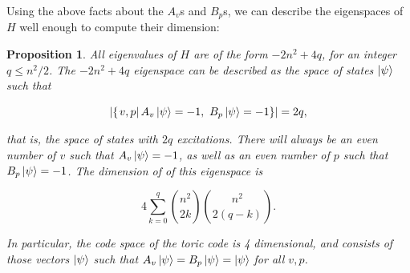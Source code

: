 \documentclass{article}
\newtheorem{proposition}{Proposition}[section]
\theoremstyle{definition}
\numberwithin{figure}{section}
\begin{document}
Using the above facts about the $A_v$s and $B_p$s, we can describe the eigenspaces of $H$ well enough to compute their dimension:

\begin{proposition}\label{eigenspaces} All eigenvalues of $H$ are of the form $-2n^2+4q$, for an integer $q\leq n^2/2$. The $-2n^2+4q$ eigenspace can be described as the space of states $\left|\psi\right>$ such that

$$\left|\left\{\left. v,p\right| A_v\left|\psi\right> =-1,\,\, B_p\left|\psi\right>=-1\right\}\right|=2q,$$

that is, the space of states with $2q$ excitations. There will always be an even number of $v$ such that $A_v\left|\psi\right> =-1$, as well as an even number of $p$ such that $B_p\left|\psi\right>=-1$. The dimension of of this eigenspace is

$$4\sum_{k=0}^{q}{n^2 \choose 2k} {n^2 \choose 2(q-k)}.$$

In particular, the code space of the toric code is 4 dimensional, and consists of those vectors $\left|\psi\right>$ such that $A_v\left|\psi\right>=B_p\left|\psi\right>=\left|\psi\right>$ for all $v,p$.
\end{proposition}
\end{document}
